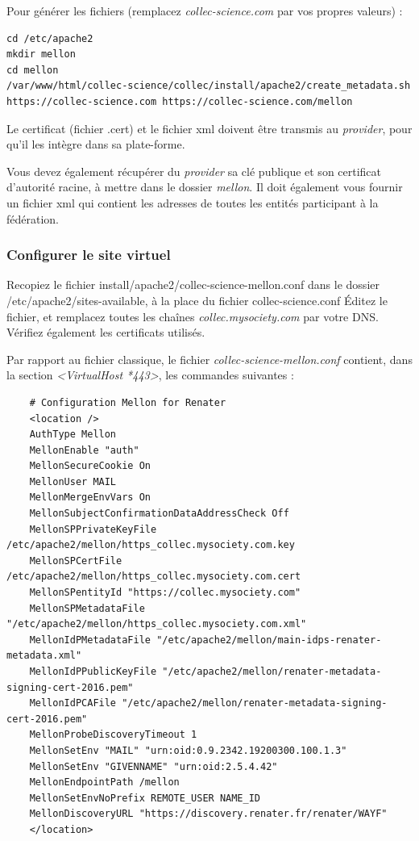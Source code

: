 Pour générer les fichiers (remplacez \textit{collec-science.com} par vos propres valeurs) : 
\begin{lstlisting}
cd /etc/apache2
mkdir mellon
cd mellon
/var/www/html/collec-science/collec/install/apache2/create_metadata.sh https://collec-science.com https://collec-science.com/mellon
\end{lstlisting}

Le certificat (fichier .cert) et le fichier xml doivent être transmis au \textit{provider}, pour qu'il les intègre dans sa plate-forme.

Vous devez également récupérer du \textit{provider} sa clé publique et son certificat d'autorité racine, à mettre dans le dossier \textit{mellon}. Il doit également vous fournir un fichier xml qui contient les adresses de toutes les entités participant à la fédération.

\subsubsection{Configurer le site virtuel}

Recopiez le fichier install/apache2/collec-science-mellon.conf dans le dossier /etc/apache2/sites-available, à la place du fichier collec-science.conf
Éditez le fichier, et remplacez toutes les chaînes \textit{collec.mysociety.com} par votre DNS. Vérifiez également les certificats utilisés.

Par rapport au fichier classique, le fichier \textit{collec-science-mellon.conf} contient, dans la section \textit{<VirtualHost *443>}, les commandes suivantes :
\begin{lstlisting}
    # Configuration Mellon for Renater
    <location />
    AuthType Mellon
    MellonEnable "auth"
    MellonSecureCookie On
    MellonUser MAIL
    MellonMergeEnvVars On
    MellonSubjectConfirmationDataAddressCheck Off
    MellonSPPrivateKeyFile /etc/apache2/mellon/https_collec.mysociety.com.key
    MellonSPCertFile /etc/apache2/mellon/https_collec.mysociety.com.cert
    MellonSPentityId "https://collec.mysociety.com"
    MellonSPMetadataFile "/etc/apache2/mellon/https_collec.mysociety.com.xml"
    MellonIdPMetadataFile "/etc/apache2/mellon/main-idps-renater-metadata.xml"
    MellonIdPPublicKeyFile "/etc/apache2/mellon/renater-metadata-signing-cert-2016.pem"
    MellonIdPCAFile "/etc/apache2/mellon/renater-metadata-signing-cert-2016.pem"
    MellonProbeDiscoveryTimeout 1
    MellonSetEnv "MAIL" "urn:oid:0.9.2342.19200300.100.1.3"
    MellonSetEnv "GIVENNAME" "urn:oid:2.5.4.42"
    MellonEndpointPath /mellon
    MellonSetEnvNoPrefix REMOTE_USER NAME_ID
    MellonDiscoveryURL "https://discovery.renater.fr/renater/WAYF"
    </location>
\end{lstlisting}

